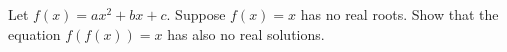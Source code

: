 Let $f(x) = ax^2 + bx + c$. Suppose $f(x) = x$ has no real roots. Show that the equation $f(f(x)) = x$ has also no real solutions.
